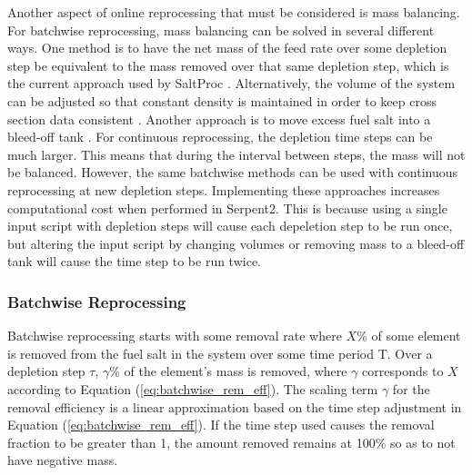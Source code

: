 Another aspect of online reprocessing that must be considered is mass balancing. For batchwise reprocessing, mass balancing can be solved in several different ways. One method is to have the net mass of the feed rate over some depletion step be equivalent to the mass removed over that same depletion step, which is the current approach used by SaltProc \cite{rykhlevskii_modeling_2019}. Alternatively, the volume of the system can be adjusted so that constant density is maintained in order to keep cross section data consistent \cite{ridley_method_2017}. Another approach is to move excess fuel salt into a bleed-off tank \cite{ridley_method_2017}. For continuous reprocessing, the depletion time steps can be much larger. This means that during the interval between steps, the mass will not be balanced. However, the same batchwise methods can be used with continuous reprocessing at new depletion steps. Implementing these approaches increases computational cost when performed in Serpent2. This is because using a single input script with depletion steps will cause each depeletion step to be run once, but altering the input script by changing volumes or removing mass to a bleed-off tank will cause the time step to be run twice.

\subsubsection{Batchwise Reprocessing}


Batchwise reprocessing starts with some removal rate where $X$\% of some element is removed from the fuel salt in the system over some time period T. Over a depletion step $\tau$, $\gamma$\% of the element's mass is removed, where $\gamma$ corresponds to $X$ according to Equation (\ref{eq:batchwise_rem_eff}). The scaling term $\gamma$ for the removal efficiency is a linear approximation based on the time step adjustment in Equation (\ref{eq:batchwise_rem_eff}). If the time step used causes the removal fraction to be greater than 1, the amount removed remains at 100\% so as to not have negative mass.

